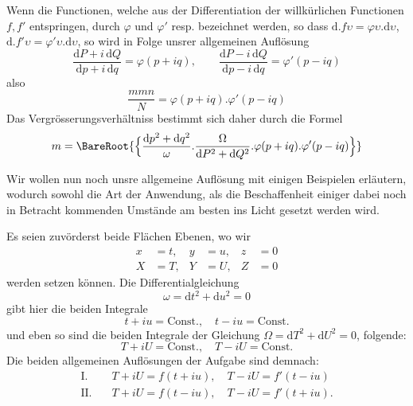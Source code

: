 Wenn die Functionen, welche aus der Differentiation der willkürlichen Functionen \(f,f'\) entspringen, durch \(\varphi\) und \(\varphi'\) resp. bezeichnet werden, so dass \(\mathrm{d}\mathord{.}f\upsilon=\varphi\upsilon\mathord{.}\mathrm{d}\upsilon\), \(\mathrm{d}\mathord{.}f'\upsilon=\varphi'\upsilon\mathord{.}\mathrm{d}\upsilon\), so wird in Folge unsrer allgemeinen Auflösung
\[
\frac{\mathrm{d}P+i\,\mathrm{d}Q}{\mathrm{d}p+i\,\mathrm{d}q}=\varphi(p+iq),\qquad
\frac{\mathrm{d}P-i\,\mathrm{d}Q}{\mathrm{d}p-i\,\mathrm{d}q}=\varphi'(p-iq)
\]
\noindent also
\[
\frac{mmn}{N}=\varphi(p+iq)\mathord{.}\varphi'(p-iq)
\]
\noindent Das Vergrösserungsverhältniss bestimmt sich daher durch die Formel
\[
m=\BareRoot{\Bigl\{\frac{\mathrm{d}p^2+\mathrm{d}q^2}{\omega}\mathord{.}\frac{\Omega}{\mathrm{d}P^2+\mathrm{d}Q^2}\mathord{.}\varphi(p+iq)\mathord{.}\varphi'(p-iq)\Bigr\}}
\]

Wir wollen nun noch unsre allgemeine Auflösung mit einigen Beispielen erläutern, wodurch sowohl die Art der Anwendung, als die Beschaffenheit einiger dabei noch in Betracht kommenden Umstände am besten ins Licht gesetzt werden wird.

Es seien zuvörderst beide Flächen Ebenen, wo wir
\[
\begin{aligned}
x&=t,&y&=u,&z&=0\\
X&=T,&Y&=U,&Z&=0
\end{aligned}
\]
\noindent werden setzen können. Die Differentialgleichung
\[
\omega=\mathrm{d}t^2+\mathrm{d}u^2=0
\]
\noindent gibt hier die beiden Integrale
\[
t+iu=\text{Const.},\quad t-iu=\text{Const.}
\]
\noindent und eben so sind die beiden Integrale der Gleichung \(\Omega=\mathrm{d}T^2+\mathrm{d}U^2=0\), folgende:
\[
T+iU=\text{Const.},\quad T-iU=\text{Const.}
\]
\noindent Die beiden allgemeinen Auflösungen der Aufgabe sind demnach:
\[
\begin{aligned}
\mathrm{I.}\quad&T+iU=f(t+iu),\quad T-iU=f'(t-iu)\\
\mathrm{II.}\quad&T+iU=f(t-iu),\quad T-iU=f'(t+iu).
\end{aligned}
\]

